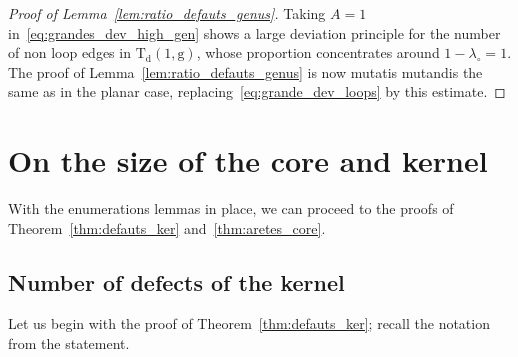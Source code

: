 \documentclass[10pt]{amsart}
\theoremstyle{plain}
\theoremstyle{definition}
\theoremstyle{remark}
\newcommand{\Triv}{\mathrm{T}}
\newcommand{\defect}{\mathrm{d}}
\newcommand{\gen}{\mathrm{g}}
\begin{document}
\begin{proof}[Proof of Lemma~\ref{lem:ratio_defauts_genus}]
Taking $A = 1$ in~\eqref{eq:grandes_dev_high_gen} shows a large deviation principle for the number of non loop edges in $\Triv_{\defect}(1, \gen)$, whose proportion concentrates around $1-\lambda_\circ = 1$.
The proof of Lemma~\ref{lem:ratio_defauts_genus} is now mutatis mutandis the same as in the planar case, replacing~\eqref{eq:grande_dev_loops} by this estimate.
\end{proof}

\section{On the size of the core and kernel}
\label{sec:preuve_core_kernel}

With the enumerations lemmas in place, we can proceed to the proofs of Theorem~\ref{thm:defauts_ker} and~\ref{thm:aretes_core}.

\subsection{Number of defects of the kernel}
\label{ssec:defauts_kernel}

Let us begin with the proof of Theorem~\ref{thm:defauts_ker}; recall the notation from the statement.
\end{document}

